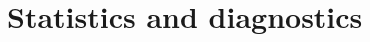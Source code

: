 \documentclass[twocolumn]{article}
\numberwithin{equation}{section}
\begin{document}






\section{Statistics and diagnostics}\label{methods:stats_and_diags}
\end{document}
